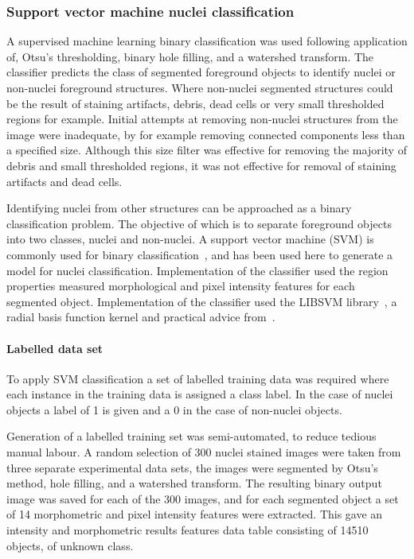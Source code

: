 \subsubsection{Support vector machine nuclei classification}
A supervised machine learning binary classification was used following application of, Otsu's thresholding, binary hole filling, and a watershed transform. The classifier predicts the class of segmented foreground objects to identify nuclei or non-nuclei foreground structures. Where non-nuclei segmented structures could be the result of staining artifacts, debris, dead cells or very small thresholded regions for example. Initial attempts at removing non-nuclei structures from the image were inadequate, by for example removing connected components less than a specified size. Although this size filter was effective for removing the majority of debris and small thresholded regions, it was not effective for removal of staining artifacts and dead cells.

Identifying nuclei from other structures can be approached as a binary classification problem. The objective of which is to separate foreground objects into two classes, nuclei and non-nuclei. A support vector machine (SVM) is commonly used for binary classification~\cite{Cortes1995}, and has been used here to generate a model for nuclei classification. Implementation of the classifier used the region properties measured morphological and pixel intensity features for each segmented object. Implementation of the classifier used the LIBSVM library~\cite{Chang2011}, a radial basis function kernel and practical advice from~\cite{Hsu2008}.

\paragraph{Labelled data set}
To apply SVM classification a set of labelled training data was required where each instance in the training data is assigned a class label. In the case of nuclei objects a label of 1 is given  and a 0 in the case of non-nuclei objects.

Generation of a labelled training set was semi-automated, to reduce tedious manual labour. A random selection of 300 nuclei stained images were taken from three separate experimental data sets, the images were segmented by Otsu's method, hole filling, and a watershed transform. The resulting binary output image was saved for each of the 300 images, and for each segmented object a set of 14 morphometric and pixel intensity features were extracted. This gave an intensity and morphometric results features data table consisting of 14510 objects, of unknown class.

